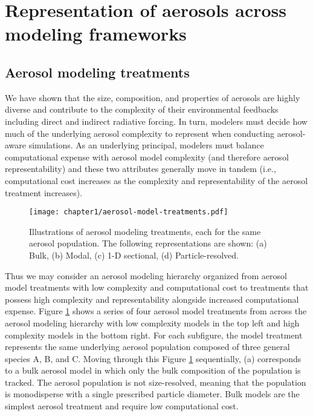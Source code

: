 \section{Representation of aerosols across modeling frameworks}\label{aerosol_model_treatments} 

\subsection{Aerosol modeling treatments}

We have shown that the size, composition, and properties of aerosols are highly diverse and contribute to the complexity of their environmental feedbacks including direct and indirect radiative forcing. In turn, modelers must decide how much of the underlying aerosol complexity to represent when conducting aerosol-aware simulations. As an underlying principal, modelers must balance computational expense with aerosol model complexity (and therefore aerosol representability) and these two attributes generally move in tandem (i.e., computational cost increases as the complexity and representability of the aerosol treatment increases). 

\begin{figure}[!t]
	\centering
	\texttt{[image: chapter1/aerosol-model-treatments.pdf]}
	\caption{Illustrations of aerosol modeling treatments, each for the same aerosol population. The following representations are shown: (a) Bulk, (b) Modal, (c) 1-D sectional, (d) Particle-resolved.}
	\label{fig:aerosol-models}
\end{figure}

Thus we may consider an aerosol modeling hierarchy organized from aerosol model treatments with low complexity and computational cost to treatments that possess high complexity and representability alongside increased computational expense. Figure \ref{fig:aerosol-models} shows a series of four aerosol model treatments from across the aerosol modeling hierarchy with low complexity models in the top left and high complexity models in the bottom right. For each subfigure, the model treatment represents the same underlying aerosol population composed of three general species A, B, and C. Moving through this Figure \ref{fig:aerosol-models} sequentially, (a) corresponds to a bulk aerosol model in which only the bulk composition of the population is tracked. The aerosol population is not size-resolved, meaning that the population is monodisperse with a single prescribed particle diameter. Bulk models are the simplest aerosol treatment and require low computational cost. 

